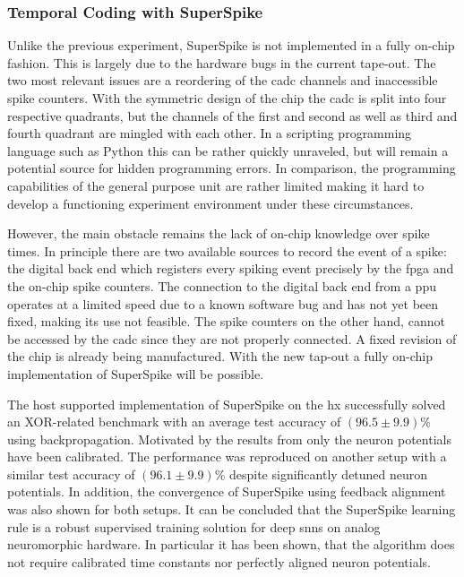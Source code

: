 \subsubsection{Temporal Coding with SuperSpike}
Unlike the previous experiment, SuperSpike is not implemented in a fully on-chip fashion. This is largely due to the hardware bugs in the current tape-out. The two most relevant issues are a reordering of the \gls{cadc} channels and inaccessible spike counters. With the symmetric design of the chip the \gls{cadc} is split into four respective quadrants, but the channels of the first and second as well as third and fourth quadrant are mingled with each other. In a scripting programming language such as Python this can be rather quickly unraveled, but will remain a potential source for hidden programming errors. In comparison, the programming capabilities of the general purpose unit are rather limited making it hard to develop a functioning experiment environment under these circumstances. 

However, the main obstacle remains the lack of on-chip knowledge over spike times. In principle there are two available sources to record the event of a spike: the digital back end which registers every spiking event precisely by the \gls{fpga} and the on-chip spike counters. The connection to the digital back end from a \gls{ppu} operates at a limited speed due to a known software bug and has not yet been fixed, making its use not feasible. The spike counters on the other hand, cannot be accessed by the \gls{cadc} since they are not properly connected. A fixed revision of the chip is already being manufactured. With the new tap-out a fully on-chip implementation of SuperSpike will be possible. 

The host supported implementation of SuperSpike on the \gls{hx} successfully solved an XOR-related benchmark with an average test accuracy of $(96.5 \pm 9.9) \%$ using backpropagation. Motivated by the results from \cite{wunderlich2019advantages} only the neuron potentials have been calibrated. The performance was reproduced on another setup with a similar test accuracy of $(96.1 \pm 9.9) \%$ despite significantly detuned neuron potentials. In addition, the convergence of SuperSpike using feedback alignment was also shown for both setups. It can be concluded that the SuperSpike learning rule is a robust supervised training solution for deep \glspl{snn} on analog neuromorphic hardware. In particular it has been shown, that the algorithm does not require calibrated time constants nor perfectly aligned neuron potentials.

